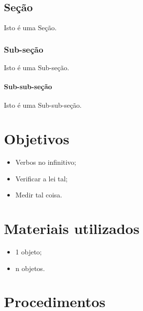 \documentclass[
   12pt,                         %
   openright,                    %
   oneside,                      %
   a4paper,                      %
   sumario = tradicional,        %
   chapter=TITLE,                %
   section=TITLE,                %
   subsection=TITLE,             %
   subsubsection=TITLE,          %
   english,                      %
   french,                       %
   spanish,                      %
   brazil,                       %
   xcolor=table                  %
]{abntex2}
\begin{document}
      \section{Seção}

         Isto é uma Seção.

         \subsection{Sub-seção}

            Isto é uma Sub-seção.

            \subsubsection{Sub-sub-seção}

               Isto é uma Sub-sub-seção.

   {\let\clearpage\relax %
   \chapter{Objetivos}
      \vspace{0.5cm}}

      \begin{itemize}
         \item Verbos no infinitivo;
         \item Verificar a lei tal;
         \item Medir tal coisa.
      \end{itemize}

      {\let\clearpage\relax
   \chapter{Materiais utilizados}
      \vspace{0.5cm}}

      \begin{itemize}
         \item 1 objeto;
         \item n objetos.
      \end{itemize}

      {\let\clearpage\relax 
   \chapter{Procedimentos}
      \vspace{0.5cm}}
\end{document}

